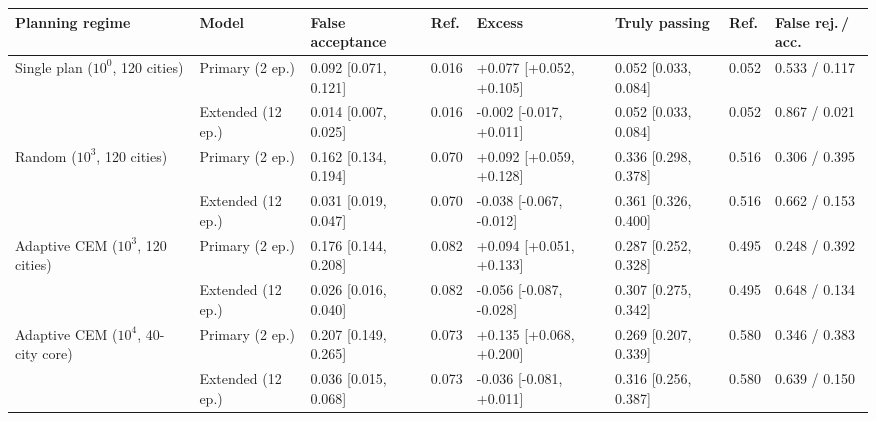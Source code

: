 \vspace{4pt}
\begin{tabular*}{\textwidth}{@{\extracolsep{\fill}}llllllll@{}}
\toprule
Planning regime & Model & False acceptance & Ref. & Excess & Truly passing & Ref. & False rej.\,/\,acc. \\
\midrule
Single plan ($10^{0}$, 120 cities) & Primary (2 ep.) & 0.092 {\tiny[0.071, 0.121]} & 0.016 & +0.077 {\tiny[+0.052, +0.105]} & 0.052 {\tiny[0.033, 0.084]} & 0.052 & 0.533 / 0.117 \\
 & Extended (12 ep.) & 0.014 {\tiny[0.007, 0.025]} & 0.016 & \mbox{-}0.002 {\tiny[\mbox{-}0.017, +0.011]} & 0.052 {\tiny[0.033, 0.084]} & 0.052 & 0.867 / 0.021 \\
\midrule
Random ($10^{3}$, 120 cities) & Primary (2 ep.) & 0.162 {\tiny[0.134, 0.194]} & 0.070 & +0.092 {\tiny[+0.059, +0.128]} & 0.336 {\tiny[0.298, 0.378]} & 0.516 & 0.306 / 0.395 \\
 & Extended (12 ep.) & 0.031 {\tiny[0.019, 0.047]} & 0.070 & \mbox{-}0.038 {\tiny[\mbox{-}0.067, \mbox{-}0.012]} & 0.361 {\tiny[0.326, 0.400]} & 0.516 & 0.662 / 0.153 \\
\midrule
Adaptive CEM ($10^{3}$, 120 cities) & Primary (2 ep.) & 0.176 {\tiny[0.144, 0.208]} & 0.082 & +0.094 {\tiny[+0.051, +0.133]} & 0.287 {\tiny[0.252, 0.328]} & 0.495 & 0.248 / 0.392 \\
 & Extended (12 ep.) & 0.026 {\tiny[0.016, 0.040]} & 0.082 & \mbox{-}0.056 {\tiny[\mbox{-}0.087, \mbox{-}0.028]} & 0.307 {\tiny[0.275, 0.342]} & 0.495 & 0.648 / 0.134 \\
\midrule
Adaptive CEM ($10^{4}$, 40-city core) & Primary (2 ep.) & 0.207 {\tiny[0.149, 0.265]} & 0.073 & +0.135 {\tiny[+0.068, +0.200]} & 0.269 {\tiny[0.207, 0.339]} & 0.580 & 0.346 / 0.383 \\
 & Extended (12 ep.) & 0.036 {\tiny[0.015, 0.068]} & 0.073 & \mbox{-}0.036 {\tiny[\mbox{-}0.081, +0.011]} & 0.316 {\tiny[0.256, 0.387]} & 0.580 & 0.639 / 0.150 \\
\bottomrule
\end{tabular*}

